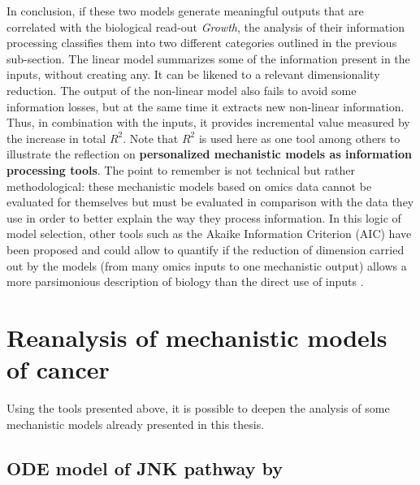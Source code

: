 \documentclass[a4paper,12pt,twoside,onecolumn,openright,final,oldfontcommands]{memoir}
\begin{document}
In conclusion, if these two models generate meaningful outputs that are
correlated with the biological read-out \emph{Growth}, the analysis of
their information processing classifies them into two different
categories outlined in the previous sub-section. The linear model
summarizes some of the information present in the inputs, without
creating any. It can be likened to a relevant dimensionality reduction.
The output of the non-linear model also fails to avoid some information
losses, but at the same time it extracts new non-linear information.
Thus, in combination with the inputs, it provides incremental value
measured by the increase in total \(R^2\). Note that \(R^2\) is used
here as one tool among others to illustrate the reflection on
\textbf{personalized mechanistic models as information processing
tools}. The point to remember is not technical but rather
methodological: these mechanistic models based on omics data cannot be
evaluated for themselves but must be evaluated in comparison with the
data they use in order to better explain the way they process
information. In this logic of model selection, other tools such as the
Akaike Information Criterion (AIC) have been proposed and could allow to
quantify if the reduction of dimension carried out by the models (from
many omics inputs to one mechanistic output) allows a more parsimonious
description of biology than the direct use of inputs
\citep{kirk2013model}.

\section{Reanalysis of mechanistic models of
cancer}\label{reanalysis-of-mechanistic-models-of-cancer}

Using the tools presented above, it is possible to deepen the analysis
of some mechanistic models already presented in this thesis.

\subsection{\texorpdfstring{ODE model of JNK pathway by
\citet{fey2015signaling}}{ODE model of JNK pathway by @fey2015signaling}}\label{ode-model-of-jnk-pathway-by-fey2015signaling}
\end{document}
